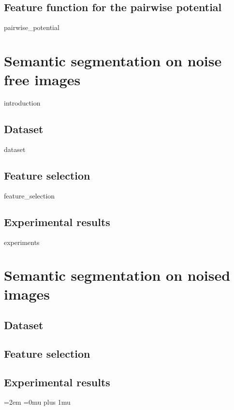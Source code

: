 \documentclass[12pt]{report}
\begin{document}
\subsection{Feature function for the pairwise potential}
{pairwise_potential}

\section{Semantic segmentation on noise free images}
{introduction} 
    
    \subsection{Dataset}
    {dataset}
 
    \subsection{Feature selection}
    \label{sec:feature_selection_noise_free}
    {feature_selection}
    
    \subsection{Experimental results}	
        {experiments}

\section{Semantic segmentation on noised images}
    \subsection{Dataset}
    
    \subsection{Feature selection}
    \label{sec:feature_selection_noise}
    
    \subsection{Experimental results}	





\newpage
\emergencystretch=2em
\Urlmuskip=0mu plus 1mu\relax
\printbibliography 
\end{document}
